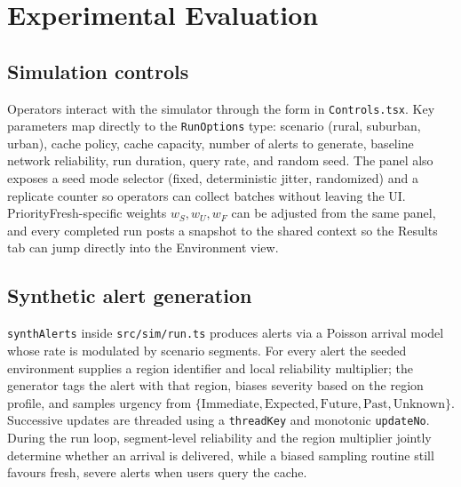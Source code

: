 \section{Experimental Evaluation}
\subsection{Simulation controls}
Operators interact with the simulator through the form in \texttt{Controls.tsx}. Key parameters map directly to the \texttt{RunOptions} type: scenario (rural, suburban, urban), cache policy, cache capacity, number of alerts to generate, baseline network reliability, run duration, query rate, and random seed. The panel also exposes a seed mode selector (fixed, deterministic jitter, randomized) and a replicate counter so operators can collect batches without leaving the UI. PriorityFresh-specific weights $w_S, w_U, w_F$ can be adjusted from the same panel, and every completed run posts a snapshot to the shared context so the Results tab can jump directly into the Environment view.

\subsection{Synthetic alert generation}
\texttt{synthAlerts} inside \texttt{src/sim/run.ts} produces alerts via a Poisson arrival model whose rate is modulated by scenario segments. For every alert the seeded environment supplies a region identifier and local reliability multiplier; the generator tags the alert with that region, biases severity based on the region profile, and samples urgency from $\{\text{Immediate},\text{Expected},\text{Future},\text{Past},\text{Unknown}\}$. Successive updates are threaded using a \texttt{threadKey} and monotonic \texttt{updateNo}. During the run loop, segment-level reliability and the region multiplier jointly determine whether an arrival is delivered, while a biased sampling routine still favours fresh, severe alerts when users query the cache.

